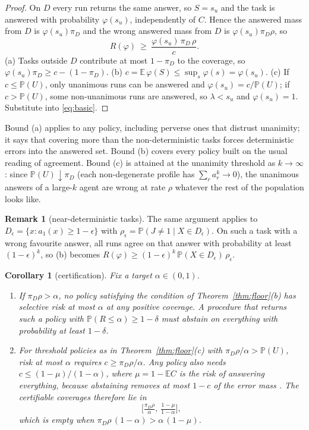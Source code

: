 \documentclass[11pt]{article}
\newtheorem{corollary}{Corollary}
\theoremstyle{definition}
\newtheorem{remark}{Remark}
\newcommand{\E}{\mathbb{E}}
\renewcommand{\P}{\mathbb{P}}
\begin{document}
\begin{proof}
On $D$ every run returns the same answer, so $S=s_u$ and the task is answered with probability
$\varphi(s_u)$, independently of $C$. Hence the answered mass from $D$ is $\varphi(s_u)\pi_D$ and the
wrong answered mass from $D$ is $\varphi(s_u)\pi_D\rho$, so
\begin{equation}\label{eq:basic}
R(\varphi)\ \ge\ \frac{\varphi(s_u)\,\pi_D\,\rho}{c}.
\end{equation}
(a) Tasks outside $D$ contribute at most $1-\pi_D$ to the coverage, so
$\varphi(s_u)\pi_D\ge c-(1-\pi_D)$. (b) $c=\E\,\varphi(S)\le\sup_s\varphi(s)=\varphi(s_u)$.
(c) If $c\le\P(U)$, only unanimous runs can be answered and $\varphi(s_u)=c/\P(U)$; if $c>\P(U)$,
some non-unanimous runs are answered, so $\lambda<s_u$ and $\varphi(s_u)=1$. Substitute into
\eqref{eq:basic}.
\end{proof}

Bound (a) applies to any policy, including perverse ones that distrust unanimity; it says that
covering more than the non-deterministic tasks forces deterministic errors into the answered set.
Bound (b) covers every policy built on the usual reading of agreement. Bound (c) is attained at
the unanimity threshold as $k\to\infty$: since $\P(U)\downarrow\pi_D$ (each non-degenerate
profile has $\sum_r a_r^k\to 0$), the unanimous answers of a large-$k$ agent are wrong at rate
$\rho$ whatever the rest of the population looks like.

\begin{remark}[near-deterministic tasks]
The same argument applies to $D_\epsilon=\{x:a_1(x)\ge 1-\epsilon\}$ with
$\rho_\epsilon=\P(J\neq 1\mid X\in D_\epsilon)$. On such a task with a wrong favourite answer,
all runs agree on that answer with probability at least $(1-\epsilon)^k$, so (b) becomes
$R(\varphi)\ge(1-\epsilon)^k\,\P(X\in D_\epsilon)\,\rho_\epsilon$.
\end{remark}

\begin{corollary}[certification]\label{cor:cert}
Fix a target $\alpha\in(0,1)$.
\begin{enumerate}[label=(\roman*),itemsep=2pt]
\item If $\pi_D\rho>\alpha$, no policy satisfying the condition of Theorem~\ref{thm:floor}(b) has
selective risk at most $\alpha$ at any positive coverage. A procedure that returns such a policy
with $\P(R\le\alpha)\ge 1-\delta$ must abstain on everything with probability at least $1-\delta$.
\item For threshold policies as in Theorem~\ref{thm:floor}(c) with $\pi_D\rho/\alpha>\P(U)$, risk
at most $\alpha$ requires $c\ge\pi_D\rho/\alpha$. Any policy also needs $c\le(1-\mu)/(1-\alpha)$,
where $\mu=1-\E C$ is the risk of answering everything, because abstaining removes at most
$1-c$ of the error mass \citep[the same bound appears in][]{kotte2026crc}. The certifiable coverages
therefore lie in
\[
\Big[\tfrac{\pi_D\rho}{\alpha},\ \tfrac{1-\mu}{1-\alpha}\Big],
\]
which is empty when $\pi_D\rho\,(1-\alpha)>\alpha\,(1-\mu)$.
\end{enumerate}
\end{corollary}
\end{document}

